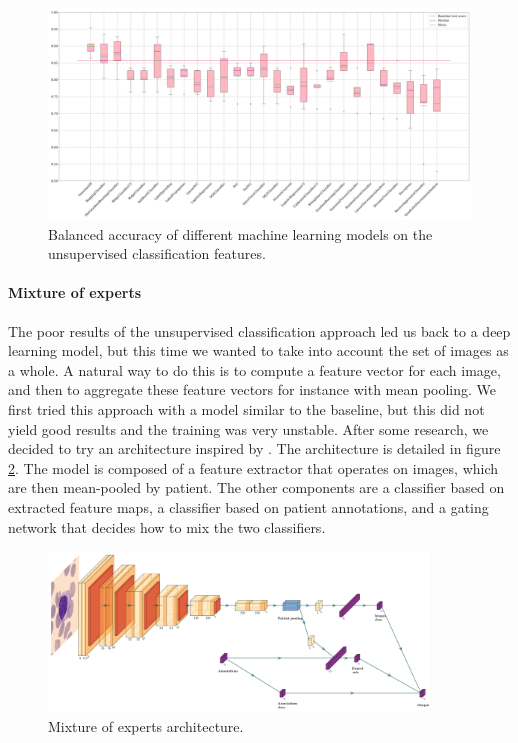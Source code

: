 \documentclass{midl}
\begin{document}
\begin{figure}[h]
    \centering
    \includegraphics[width=\textwidth]{figures/unsupervised_classification_models.png}
    \caption{Balanced accuracy of different machine learning models on the unsupervised classification features.}
    \label{fig:unsupervised_classification_models}
\end{figure}

\paragraph*{Mixture of experts}
The poor results of the unsupervised classification approach led us back to a deep learning model, but this time we wanted to take into account the set of images as a whole. A natural way to do this is to compute a feature vector for each image, and then to aggregate these feature vectors for instance with mean pooling. We first tried this approach with a model similar to the baseline, but this did not yield good results and the training was very unstable. After some research, we decided to try an architecture inspired by \cite{Sahasrabudhe_2021}. The architecture is detailed in figure \ref{fig:mixture_of_experts}. The model is composed of a feature extractor that operates on images, which are then mean-pooled by patient. The other components are a classifier based on extracted feature maps, a classifier based on patient annotations, and a gating network that decides how to mix the two classifiers.

\begin{figure}[h]
    \centering
    \includegraphics[width=0.9\textwidth]{figures/moe.png}
    \caption{Mixture of experts architecture.}
    \label{fig:mixture_of_experts}
\end{figure}
\end{document}
